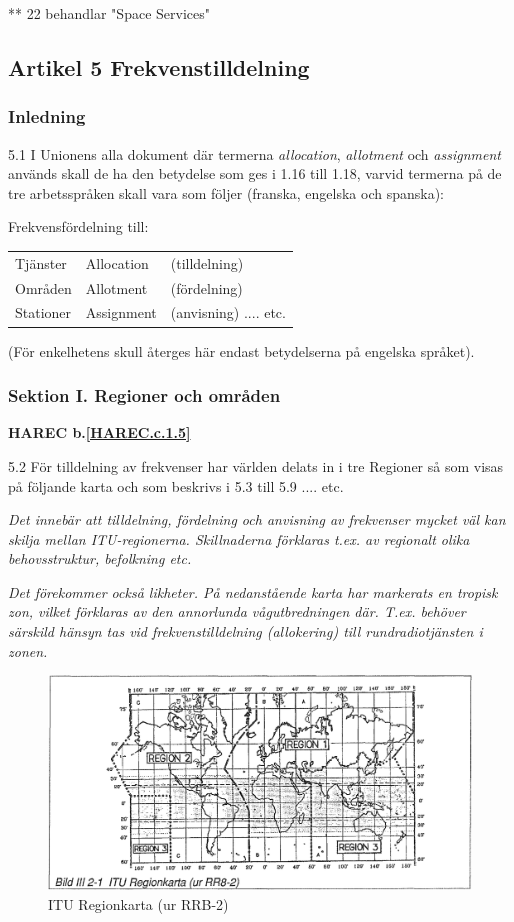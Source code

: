 ** 22 behandlar "Space Services"

\subsection{Artikel 5 Frekvenstilldelning}

\subsubsection{Inledning}

5.1 I Unionens alla dokument där termerna \emph{allocation},
\emph{allotment} och \emph{assignment} används skall de ha den
betydelse som ges i 1.16 till 1.18, varvid termerna på de tre
arbetsspråken skall vara som följer (franska, engelska och spanska):
\cite[5.1]{ITU-RR}

Frekvensfördelning till:
\begin{tabular}{lll}
  Tjänster & Allocation & (tilldelning) \\
  Områden & Allotment & (fördelning) \\
  Stationer & Assignment & (anvisning) .... etc. \\
\end{tabular}

(För enkelhetens skull återges här endast betydelserna på engelska språket).

\subsubsection{Sektion I. Regioner och områden}
\textbf{
HAREC b.\ref{HAREC.c.1.5}\label{myHAREC.c.1.5}
}

5.2 För tilldelning av frekvenser har världen delats in i tre
Regioner så som visas på följande karta och som beskrivs i 5.3 till
5.9 .... etc.
\cite[5.2]{ITU-RR}

\emph{ Det innebär att tilldelning, fördelning och anvisning av
  frekvenser mycket väl kan skilja mellan ITU-regionerna. Skillnaderna
  förklaras t.ex. av regionalt olika behovsstruktur, befolkning etc.}

\emph{Det förekommer också likheter. På nedanstående karta har
  markerats en tropisk zon, vilket förklaras av den annorlunda
  vågutbredningen där. T.ex. behöver särskild hänsyn tas vid
  frekvenstilldelning (allokering) till rundradiotjänsten i zonen.}

\begin{figure}
  \includegraphics[width=\textwidth]{images/bild_3_2-01}
  \caption{ITU Regionkarta (ur RRB-2)}
  \label{fig:bildIII2-1}
\end{figure}
